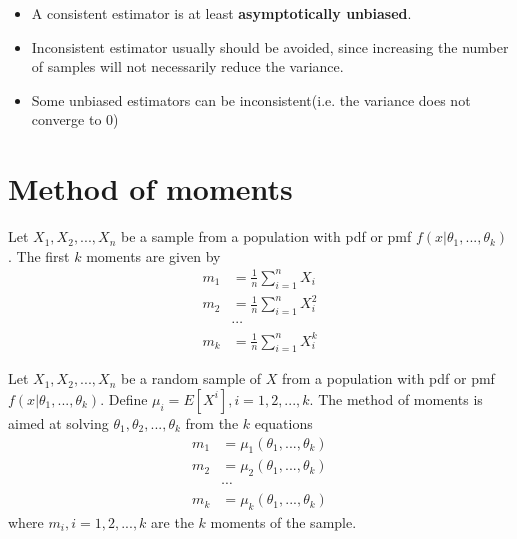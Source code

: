 \begin{refsection}
\begin{remark}\hfill
	\begin{itemize}
		\item A consistent estimator is at least \textbf{asymptotically unbiased}.
		\item Inconsistent estimator usually should be avoided, since increasing the number of samples will not necessarily reduce the variance.
		\item Some unbiased estimators can be inconsistent(i.e. the variance does not converge to 0)
	\end{itemize}
\end{remark}





\section{Method of moments}

\begin{definition}\cite[312]{casella2002statistical} Let $X_1,X_2,...,X_n$ be a sample from a population with pdf or pmf $f(x|\theta_1,...,\theta_k)$. The first $k$ moments are given by
	\begin{align*}
	m_1 &= \frac{1}{n}\sum_{i=1}^n X_i \\
	m_2 &= \frac{1}{n}\sum_{i=1}^n X_i^2 \\
	&\cdots \\
	m_k &= \frac{1}{n}\sum_{i=1}^n X_i^k 
	\end{align*}	
\end{definition}


\begin{definition}\cite[312]{casella2002statistical} Let $X_1,X_2,...,X_n$ be a random sample of $X$ from a population with pdf or pmf $f(x|\theta_1,...,\theta_k)$. Define $\mu_i = E[X^i],i=1,2,...,k$. The method of moments is aimed at solving $\theta_1,\theta_2,...,\theta_k$ from the $k$ equations
	\begin{align*}
	m_1 &= \mu_1(\theta_1,...,\theta_k) \\
	m_2 &= \mu_2(\theta_1,...,\theta_k) \\
	&\cdots \\
	m_k &= \mu_k(\theta_1,...,\theta_k) 
	\end{align*}
	where $m_i,i=1,2,...,k$ are the $k$ moments of the sample.			
\end{definition}



\end{refsection}
